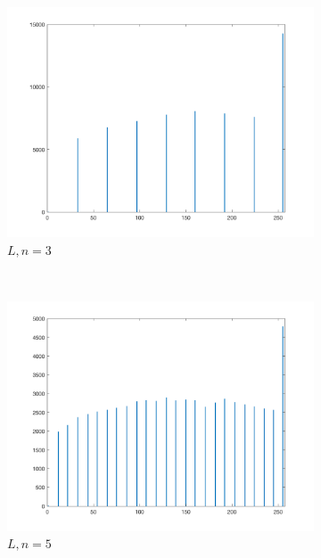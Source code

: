 \documentclass{article}
\begin{document}
\begin{enumerate}[label=(\alph*)]
    \begin{figure}[!htb]
        \centering
        \begin{subfigure}[b]{0.3\textwidth}
            \includegraphics[width=\textwidth]{img/hist_L3.png}
            \caption{$L, n = 3$}
        \end{subfigure}
        ~
        \begin{subfigure}[b]{0.3\textwidth}
            \includegraphics[width=\textwidth]{img/hist_L5.png}
            \caption{$L, n = 5$}
        \end{subfigure}
        ~
        \begin{subfigure}[b]{0.3\textwidth}

\end{subfigure}
\end{figure}
\end{enumerate}
\end{document}
